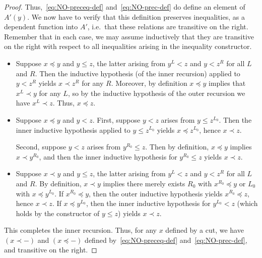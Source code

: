 \begin{proof}
  Thus,~\eqref{eq:NO-preceq-def} and~\eqref{eq:NO-prec-def} do define an element of $A'(y)$.
  We now have to verify that this definition preserves inequalities, as a dependent function into $A'$, i.e.\ that these relations are transitive on the right.
  Remember that in each case, we may assume inductively that they are transitive on the right with respect to all inequalities arising in the inequality constructor.
  \begin{itemize}
  \item Suppose $x\preceq y$ and $y\le z$, the latter arising from $y^L<z$ and $y<z^R$ for all $L$ and $R$.
    Then the inductive hypothesis (of the inner recursion) applied to $y<z^R$ yields $x\prec z^R$ for any $R$.
    Moreover, by definition $x\preceq y$ implies that $x^L \prec y$ for any $L$, so by the inductive hypothesis of the outer recursion we have $x^L \prec z$.
    Thus, $x\preceq z$.
  \item Suppose $x\preceq y$ and $y<z$.
    First, suppose $y<z$ arises from $y\le z^{L_0}$.
    Then the inner inductive hypothesis applied to $y\le z^{L_0}$ yields $x \preceq z^{L_0}$, hence $x\prec z$.

    Second, suppose $y<z$ arises from $y^{R_0}\le z$.
    Then by definition, $x\preceq y$ implies $x\prec y^{R_0}$, and then the inner inductive hypothesis for $y^{R_0}\le z$ yields $x\prec z$.
  \item Suppose $x\prec y$ and $y\le z$, the latter arising from $y^L<z$ and $y<z^R$ for all $L$ and $R$.
    By definition, $x\prec y$ implies there merely exists $R_0$ with $x^{R_0}\preceq y$ or $L_0$ with $x\preceq y^{L_0}$.
    If $x^{R_0}\preceq y$, then the outer inductive hypothesis yields $x^{R_0}\preceq z$, hence $x\prec z$.
    If $x\preceq y^{L_0}$, then the inner inductive hypothesis for $y^{L_0}<z$ (which holds by the constructor of $y\le z$) yields $x\prec z$.

  \end{itemize}
  This completes the inner recursion.
  Thus, for any $x$ defined by a cut, we have $(x\prec -)$ and $(x\preceq -)$ defined by~\eqref{eq:NO-preceq-def} and~\eqref{eq:NO-prec-def}, and transitive on the right.


\end{proof}
